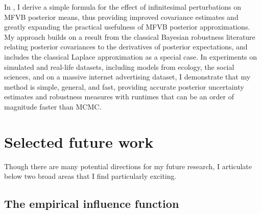 
In \citet{giordano:2015:linear, giordano:2018:covariances}, I derive a simple
formula for the effect of infinitesimal perturbations on MFVB posterior means,
thus providing improved covariance estimates and greatly expanding the practical
usefulness of MFVB posterior approximations. My approach builds on a result from
the classical Bayesian robustness literature relating posterior covariances to
the derivatives of posterior expectations, and includes the classical Laplace
approximation as a special case.
In experiments on simulated and real-life datasets,  including models from
ecology, the social sciences,
and on a massive internet advertising dataset, I
demonstrate that my method is simple, general, and fast, providing accurate
posterior uncertainty estimates and robustness measures with runtimes that can
be an order of magnitude faster than MCMC.



\section{Selected future work}


Though there are many potential directions for my future research, I articulate
below two broad areas that I find particularly exciting.

\subsection{The empirical influence function}

